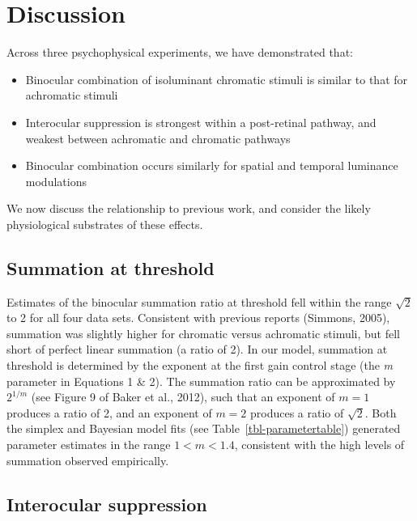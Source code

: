 \documentclass[
  letterpaper,
  DIV=11,
  numbers=noendperiod]{scrartcl}
\providecommand{\tightlist}{%
  \setlength{\itemsep}{0pt}\setlength{\parskip}{0pt}}\usepackage{longtable,booktabs,array}
\begin{document}
\hypertarget{discussion}{%
\section{Discussion}\label{discussion}}

Across three psychophysical experiments, we have demonstrated that:

\begin{itemize}
\tightlist
\item
  Binocular combination of isoluminant chromatic stimuli is similar to
  that for achromatic stimuli
\item
  Interocular suppression is strongest within a post-retinal pathway,
  and weakest between achromatic and chromatic pathways
\item
  Binocular combination occurs similarly for spatial and temporal
  luminance modulations
\end{itemize}

We now discuss the relationship to previous work, and consider the
likely physiological substrates of these effects.

\hypertarget{summation-at-threshold}{%
\subsection{Summation at threshold}\label{summation-at-threshold}}

Estimates of the binocular summation ratio at threshold fell within the
range \(\sqrt{2}\) to 2 for all four data sets. Consistent with previous
reports (Simmons, 2005), summation was slightly higher for chromatic
versus achromatic stimuli, but fell short of perfect linear summation (a
ratio of 2). In our model, summation at threshold is determined by the
exponent at the first gain control stage (the \emph{m} parameter in
Equations 1 \& 2). The summation ratio can be approximated by
\(2^{1/m}\) (see Figure 9 of Baker et al., 2012), such that an exponent
of \(m=1\) produces a ratio of 2, and an exponent of \(m = 2\) produces
a ratio of \(\sqrt{2}\). Both the simplex and Bayesian model fits (see
Table~\ref{tbl-parametertable}) generated parameter estimates in the
range \(1 < m < 1.4\), consistent with the high levels of summation
observed empirically.

\hypertarget{interocular-suppression}{%
\subsection{Interocular suppression}\label{interocular-suppression}}
\end{document}
